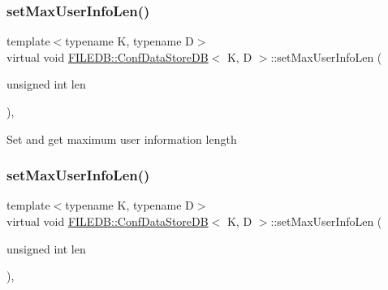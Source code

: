 \subsubsection{\texorpdfstring{setMaxUserInfoLen()}{setMaxUserInfoLen()}\hspace{0.1cm}{\footnotesize\ttfamily [1/2]}}
{\footnotesize\ttfamily template$<$typename K, typename D$>$ \\
virtual void \mbox{\hyperlink{classFILEDB_1_1ConfDataStoreDB}{F\+I\+L\+E\+D\+B\+::\+Conf\+Data\+Store\+DB}}$<$ K, D $>$\+::set\+Max\+User\+Info\+Len (\begin{DoxyParamCaption}\item[{unsigned int}]{len }\end{DoxyParamCaption})\hspace{0.3cm}{\ttfamily [inline]}, {\ttfamily [virtual]}}

Set and get maximum user information length \mbox{\label{classFILEDB_1_1ConfDataStoreDB_a02a2fcc79ba97c11b4ec1ec0321e5415}} 
\subsubsection{\texorpdfstring{setMaxUserInfoLen()}{setMaxUserInfoLen()}\hspace{0.1cm}{\footnotesize\ttfamily [2/2]}}
{\footnotesize\ttfamily template$<$typename K, typename D$>$ \\
virtual void \mbox{\hyperlink{classFILEDB_1_1ConfDataStoreDB}{F\+I\+L\+E\+D\+B\+::\+Conf\+Data\+Store\+DB}}$<$ K, D $>$\+::set\+Max\+User\+Info\+Len (\begin{DoxyParamCaption}\item[{unsigned int}]{len }\end{DoxyParamCaption})\hspace{0.3cm}{\ttfamily [inline]}, {\ttfamily [virtual]}}

